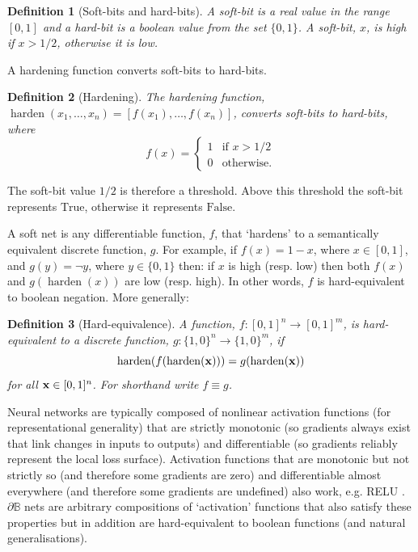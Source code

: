 \documentclass{article} %
\newtheorem*{definition}{Definition}
\begin{document}
\begin{definition}[Soft-bits and hard-bits]
A {\em soft-bit} is a real value in the range $[0,1]$ and a {\em hard-bit} is a boolean value from the set $\{0,1\}$. A soft-bit, $x$, is {\em high} if $x>1/2$, otherwise it is {\em low}.
\end{definition}

A hardening function converts soft-bits to hard-bits.

\begin{definition}[Hardening]
The {\em hardening} function, $\operatorname{harden}(x_{1}, \dots, x_{n}) = [f(x_{1}), \dots, f(x_{n})]$, converts soft-bits to hard-bits, where
\begin{equation*}
f(x) =
\begin{cases}
1 & \text{if } x > 1/2 \\
0 & \text{otherwise.}
\end{cases}
\end{equation*}
\end{definition}

The soft-bit value $1/2$ is therefore a threshold. Above this threshold the soft-bit represents $\text{True}$, otherwise it represents $\text{False}$.

A soft net is any differentiable function, $f$, that `hardens' to a semantically equivalent discrete function, $g$. For example, if $f(x) = 1 - x$, where $x \in [0,1]$, and $g(y) = \neg y$, where $y \in \{0,1\}$ then: if $x$ is high (resp. low) then both $f(x)$ and $g(\operatorname{harden}(x))$ are low (resp. high). In other words, $f$ is hard-equivalent to boolean negation. More generally:

\begin{definition}[Hard-equivalence]
	A function, $f: [0,1]^n \rightarrow [0,1]^m$, is {\em hard-equivalent} to a discrete function, $g: \{1,0\}^n \rightarrow \{1,0\}^m$,	if
	\begin{equation*}
	\operatorname{harden}(f(\operatorname{harden}({\bf x}))) = g(\operatorname{harden}({\bf x}))
	\end{equation*}
for all ${\bf x} \in [0,1]^{n}$. For shorthand write $f \equiv g$.
\end{definition}

Neural networks are typically composed of nonlinear activation functions (for representational generality) that are strictly monotonic (so gradients always exist that link changes in inputs to outputs) and differentiable (so gradients reliably represent the local loss surface). Activation functions that are monotonic but not strictly so (and therefore some gradients are zero) and differentiable almost everywhere (and therefore some gradients are undefined) also work, e.g. RELU \citep{10.5555/3104322.3104425}. $\partial \mathbb{B}$ nets are arbitrary compositions of `activation' functions that also satisfy these properties but in addition are hard-equivalent to boolean functions (and natural generalisations).
\end{document}
